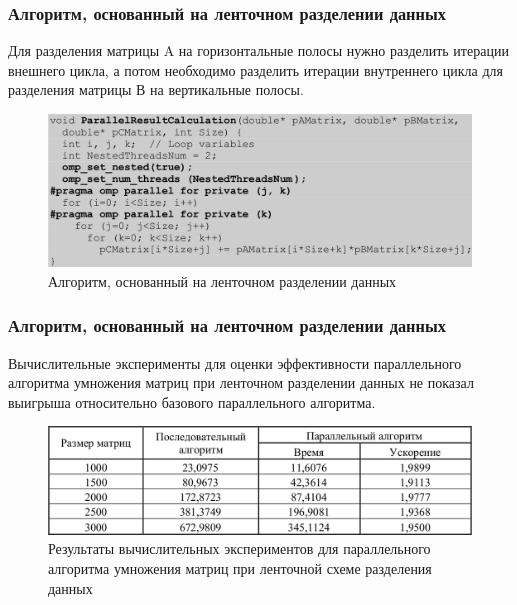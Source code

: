 \documentclass{beamer}
\begin{document}

\begin{frame}
\frametitle{Алгоритм, основанный на ленточном разделении данных}

Для разделения матрицы A на горизонтальные полосы нужно разделить итерации внешнего цикла, а потом необходимо разделить итерации внутреннего цикла для разделения матрицы В на вертикальные полосы.

\begin{figure}
\includegraphics[scale=0.28]{res/pic009}
\caption{Алгоритм, основанный на ленточном разделении данных}
\end{figure}

\end{frame}


\begin{frame}
\frametitle{Алгоритм, основанный на ленточном разделении данных}

Вычислительные эксперименты для оценки эффективности параллельного алгоритма умножения матриц при ленточном разделении данных не показал выигрыша относительно базового параллельного алгоритма.

\begin{figure}
\includegraphics[scale=0.28]{res/pic010}
\caption{Результаты вычислительных экспериментов для параллельного алгоритма умножения матриц при ленточной схеме разделения данных}
\end{figure}

\end{frame}

\end{document}

